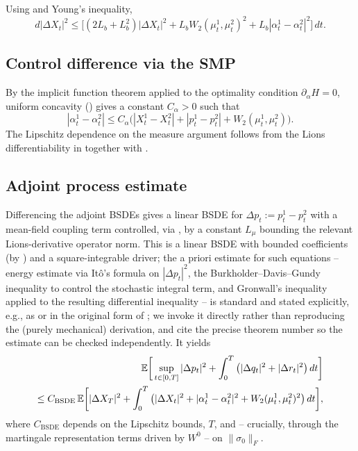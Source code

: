 \documentclass[11pt]{article}
\theoremstyle{remark}
\begin{document}
Using  and Young's inequality,
\begin{equation}
    d|\Delta X_t|^2 \le \big[(2L_b + L_b^2)|\Delta X_t|^2 + L_b W_2(\mu_t^1,\mu_t^2)^2 +
    L_b|\alpha_t^1-\alpha_t^2|^2\big]\, dt.
    \label{eq:gronwall-setup}
\end{equation}

\subsection{Control difference via the SMP}

By the implicit function theorem applied to the optimality condition
$\partial_\alpha H = 0$, uniform concavity () gives a constant
$C_\alpha > 0$ such that
\begin{equation}
    |\alpha_t^1 - \alpha_t^2| \le C_\alpha\big(|X_t^1-X_t^2| + |p_t^1-p_t^2| +
    W_2(\mu_t^1,\mu_t^2)\big).
    \label{eq:control-lipschitz}
\end{equation}
The Lipschitz dependence on the measure argument follows from the Lions
differentiability in  together with
\citet[Prop.~5.35]{carmonadelarue2018}.

\subsection{Adjoint process estimate}

Differencing the adjoint BSDEs gives a linear BSDE for $\Delta p_t := p_t^1 - p_t^2$
with a mean-field coupling term controlled, via , by a constant
$L_\mu$ bounding the relevant Lions-derivative operator norm. This is a linear BSDE
with bounded coefficients (by ) and a
square-integrable driver; the a priori estimate for such equations -- energy
estimate via It\^o's formula on $|\Delta p_t|^2$, the Burkholder--Davis--Gundy
inequality to control the stochastic integral term, and Gronwall's inequality
applied to the resulting differential inequality -- is standard and stated
explicitly, e.g., as \citet[Thm.~4.3.1]{zhang2017} or in the original form of
\citet{elkarouietal1997}; we invoke it directly rather than reproducing the (purely
mechanical) derivation, and cite the precise theorem number so the estimate can be
checked independently. It yields
\begin{align}
    \mathbb{E}\bigg[\sup_{t\in[0,T]} |\Delta p_t|^2 + \int_0^T \big(|\Delta q_t|^2 +
    |\Delta r_t|^2\big)\, dt\bigg] \notag \\
    \le C_{\mathrm{BSDE}}\, \mathbb{E}\bigg[|\Delta X_T|^2 + \int_0^T \big(|\Delta
    X_t|^2 + |\alpha_t^1-\alpha_t^2|^2 + W_2(\mu_t^1,\mu_t^2)^2\big)\, dt\bigg],
    \label{eq:bsde-estimate}
\end{align}
where $C_{\mathrm{BSDE}}$ depends on the Lipschitz bounds, $T$, and -- crucially,
through the martingale representation terms driven by $W^0$ -- on $\|\sigma_0\|_F$.
\end{document}
